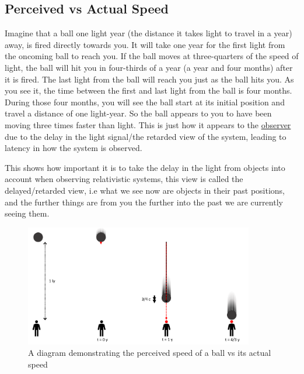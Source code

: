 \subsection{Perceived vs Actual Speed}

Imagine that a ball one light year (the distance it takes light to travel in a year) away, is fired directly towards you. It will take one year for the first light from the oncoming ball to reach you. If the ball moves at three-quarters of the speed of light, the ball will hit you in four-thirds of a year (a year and four months) after it is fired. The last light from the ball will reach you just as the ball hits you. As you see it, the time between the first and last light from the ball is four months. During those four months, you will see the ball start at its initial position and travel a distance of one light-year. So the ball appears to you to have been moving three times faster than light. This is just how it appears to the \hyperlink{def-observer}{observer} due to the delay in the light signal/the retarded view of the system, leading to latency in how the system is observed.

This shows how important it is to take the delay in the light from objects into account when observing relativistic systems, this view is called the delayed/retarded view, i.e what we see now are objects in their past positions, and the further things are from you the further into the past we are currently seeing them.

\begin{figure}[H]
	\centering
	\includegraphics[width=10cm]{images/pdf/Perceived_speed.pdf}
	\caption{A diagram demonstrating the perceived speed of a ball vs its actual speed}
	\label{fig: perceived vs actual speed}
\end{figure}

